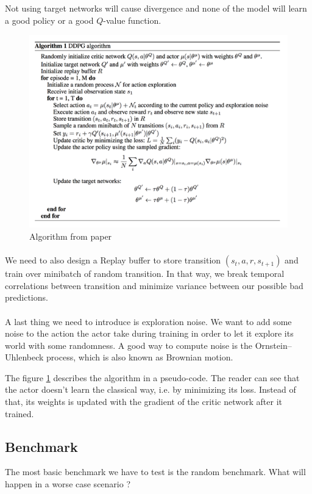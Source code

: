 \documentclass{article}
\begin{document}
Not using target networks will cause divergence and none of the model will learn
a good policy or a good $Q$-value function.

\begin{figure}[ht]
  \centering
  \includegraphics[width=.5\textwidth]{algoDDPG}
  \caption{Algorithm from \citeauthor{journals/corr/LillicrapHPHETS15} paper}
  \label{fig:algoDDPG}
\end{figure}

\paragraph{}
We need to also design a Replay buffer to store transition $(s_t, a, r,
s_{t+1})$ and train over minibatch of random transition. In that way, we break
temporal correlations between transition and minimize variance between our
possible bad predictions.

\paragraph{}
A last thing we need to introduce is exploration noise. We want to add some noise to the
action the actor take during training in order to let it explore its world with
some randomness. A good way to compute noise is the Ornstein–Uhlenbeck process,
which is also known as Brownian motion. 

The figure \ref{fig:algoDDPG} describes the algorithm in a pseudo-code. The
reader can see that the actor doesn't learn the classical way, i.e. by
minimizing its loss. Instead of that, its weights is updated with the gradient
of the critic network after it trained. 

\subsection{Benchmark}

The most basic benchmark we have to test is the random benchmark. What will
happen in a worse case scenario ? 
\end{document}
